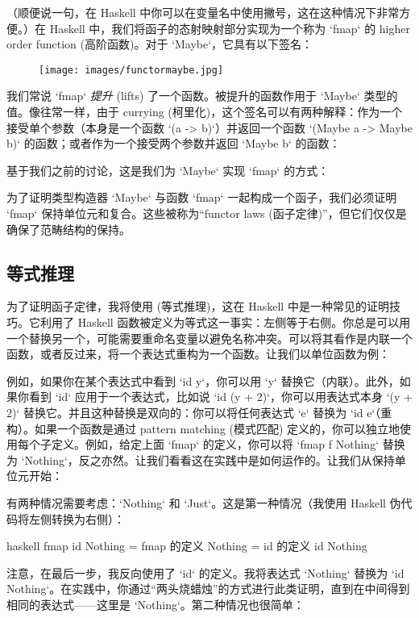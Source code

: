 （顺便说一句，在 Haskell 中你可以在变量名中使用撇号，这在这种情况下非常方便。）在 Haskell 中，我们将函子的态射映射部分实现为一个称为 `fmap` 的 higher order function (高阶函数)。对于 `Maybe`，它具有以下签名：


\begin{figure}[H]
  \centering
  \texttt{[image: images/functormaybe.jpg]}
\end{figure}

\noindent
我们常说 `fmap` \emph{提升} (lifts) 了一个函数。被提升的函数作用于 `Maybe` 类型的值。像往常一样，由于 currying (柯里化)，这个签名可以有两种解释：作为一个接受单个参数（本身是一个函数 `(a -> b)`）并返回一个函数 `(Maybe a -> Maybe b)` 的函数；或者作为一个接受两个参数并返回 `Maybe b` 的函数：

基于我们之前的讨论，这是我们为 `Maybe` 实现 `fmap` 的方式：

为了证明类型构造器 `Maybe` 与函数 `fmap` 一起构成一个函子，我们必须证明 `fmap` 保持单位元和复合。这些被称为“functor laws (函子定律)”，但它们仅仅是确保了范畴结构的保持。

\subsection{等式推理}

为了证明函子定律，我将使用  (等式推理)，这在 Haskell 中是一种常见的证明技巧。它利用了 Haskell 函数被定义为等式这一事实：左侧等于右侧。你总是可以用一个替换另一个，可能需要重命名变量以避免名称冲突。可以将其看作是内联一个函数，或者反过来，将一个表达式重构为一个函数。让我们以单位函数为例：

例如，如果你在某个表达式中看到 `id y`，你可以用 `y` 替换它（内联）。此外，如果你看到 `id` 应用于一个表达式，比如说 `id (y + 2)`，你可以用表达式本身 `(y + 2)` 替换它。并且这种替换是双向的：你可以将任何表达式 `e` 替换为 `id e`（重构）。如果一个函数是通过 pattern matching (模式匹配) 定义的，你可以独立地使用每个子定义。例如，给定上面 `fmap` 的定义，你可以将 `fmap f Nothing` 替换为 `Nothing`，反之亦然。让我们看看这在实践中是如何运作的。让我们从保持单位元开始：

有两种情况需要考虑：`Nothing` 和 `Just`。这是第一种情况（我使用 Haskell 伪代码将左侧转换为右侧）：

\begin{snip}{haskell}
  fmap id Nothing
= { fmap 的定义 }
  Nothing
= { id 的定义 }
  id Nothing
\end{snip}
注意，在最后一步，我反向使用了 `id` 的定义。我将表达式 `Nothing` 替换为 `id Nothing`。在实践中，你通过“两头烧蜡烛”的方式进行此类证明，直到在中间得到相同的表达式——这里是 `Nothing`。第二种情况也很简单：

